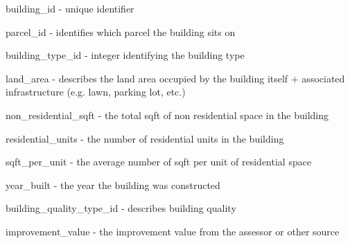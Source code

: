 \begin{description}
\item building\_id - unique identifier
\item parcel\_id - identifies which parcel the building sits on
\item building\_type\_id - integer identifying the building type
\item land\_area - describes the land area occupied by the building itself + associated infrastructure (e.g. lawn, parking lot, etc.)
\item non\_residential\_sqft - the total sqft of non residential space in the building
\item residential\_units - the number of residential units in the building
\item sqft\_per\_unit - the average number of sqft per unit of residential space
\item year\_built - the year the building was constructed
\item building\_quality\_type\_id - describes building quality
\item improvement\_value - the improvement value from the assessor or other source 
\end{description}
